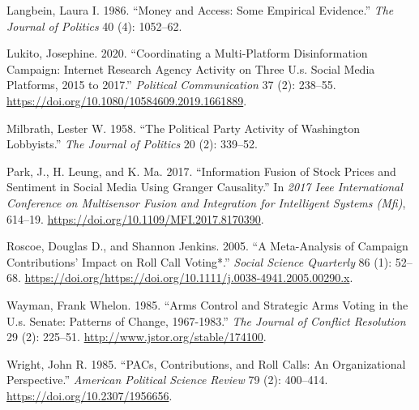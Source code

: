 \documentclass[12pt,]{article}
\begin{document}
\leavevmode\hypertarget{ref-langbein1986}{}%
Langbein, Laura I. 1986. ``Money and Access: Some Empirical Evidence.''
\emph{The Journal of Politics} 40 (4): 1052--62.

\leavevmode\hypertarget{ref-lukito2020}{}%
Lukito, Josephine. 2020. ``Coordinating a Multi-Platform Disinformation
Campaign: Internet Research Agency Activity on Three U.s. Social Media
Platforms, 2015 to 2017.'' \emph{Political Communication} 37 (2):
238--55. \url{https://doi.org/10.1080/10584609.2019.1661889}.

\leavevmode\hypertarget{ref-milbrath1958}{}%
Milbrath, Lester W. 1958. ``The Political Party Activity of Washington
Lobbyists.'' \emph{The Journal of Politics} 20 (2): 339--52.

\leavevmode\hypertarget{ref-park2017}{}%
Park, J., H. Leung, and K. Ma. 2017. ``Information Fusion of Stock
Prices and Sentiment in Social Media Using Granger Causality.'' In
\emph{2017 Ieee International Conference on Multisensor Fusion and
Integration for Intelligent Systems (Mfi)}, 614--19.
\url{https://doi.org/10.1109/MFI.2017.8170390}.

\leavevmode\hypertarget{ref-roscoe2005}{}%
Roscoe, Douglas D., and Shannon Jenkins. 2005. ``A Meta-Analysis of
Campaign Contributions' Impact on Roll Call Voting*.'' \emph{Social
Science Quarterly} 86 (1): 52--68.
\url{https://doi.org/https://doi.org/10.1111/j.0038-4941.2005.00290.x}.

\leavevmode\hypertarget{ref-wayman1985}{}%
Wayman, Frank Whelon. 1985. ``Arms Control and Strategic Arms Voting in
the U.s. Senate: Patterns of Change, 1967-1983.'' \emph{The Journal of
Conflict Resolution} 29 (2): 225--51.
\url{http://www.jstor.org/stable/174100}.

\leavevmode\hypertarget{ref-wright1985}{}%
Wright, John R. 1985. ``PACs, Contributions, and Roll Calls: An
Organizational Perspective.'' \emph{American Political Science Review}
79 (2): 400--414. \url{https://doi.org/10.2307/1956656}.





\newpage
\singlespacing 
\end{document}
